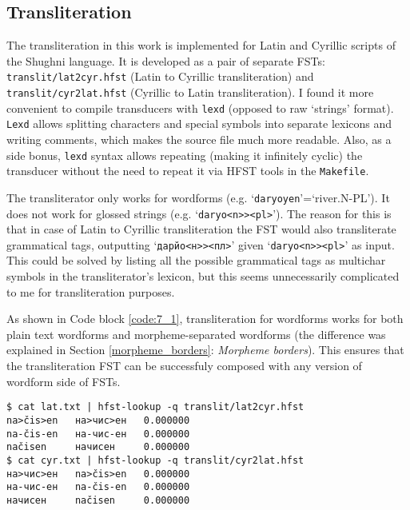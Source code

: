 \subsection{Transliteration} \label{translit_section}
The transliteration in this work is implemented for Latin and Cyrillic scripts of the Shughni language. It is developed as a pair of separate FSTs: \texttt{translit/lat2cyr.hfst} (Latin to Cyrillic transliteration) and \texttt{translit/cyr2lat.hfst} (Cyrillic to Latin transliteration). I found it more convenient to compile transducers with \texttt{lexd} (opposed to raw `strings' format). \texttt{Lexd} allows splitting characters and special symbols into separate lexicons and writing comments, which makes the source file much more readable. Also, as a side bonus, \texttt{lexd} syntax allows repeating (making it infinitely cyclic) the transducer without the need to repeat it via HFST tools in the \texttt{Makefile}.

The transliterator only works for wordforms (e.g. `\texttt{daryoyen}'=`river.N-PL'). It does not work for glossed strings (e.g. `\texttt{daryo<n>><pl>}'). The reason for this is that in case of Latin to Cyrillic transliteration the FST would also transliterate grammatical tags, outputting `\texttt{дарйо<н>><пл>}' given `\texttt{daryo<n>><pl>}' as input. This could be solved by listing all the possible grammatical tags as multichar symbols in the transliterator's lexicon, but this seems unnecessarily complicated to me for transliteration purposes. 

As shown in Code block \ref{code:7_1}, transliteration for wordforms works for both plain text wordforms and morpheme-separated wordforms (the difference was explained in Section \ref{morpheme_borders}: \textit{Morpheme borders}). This ensures that the transliteration FST can be successfuly composed with any version of wordform side of FSTs.

\begin{code_frame}[float]
    \begin{footnotesize}\codespacing
    \begin{verbatim}
$ cat lat.txt | hfst-lookup -q translit/lat2cyr.hfst
na>čis>en   на>чис>ен   0.000000
na-čis-en   на-чис-ен   0.000000
načisen     начисен     0.000000
$ cat cyr.txt | hfst-lookup -q translit/cyr2lat.hfst
на>чис>ен   na>čis>en   0.000000
на-чис-ен   na-čis-en   0.000000
начисен     načisen     0.000000
    \end{verbatim}
    \end{footnotesize}
    \tcblower
    \label{code:7_1}
\end{code_frame}


